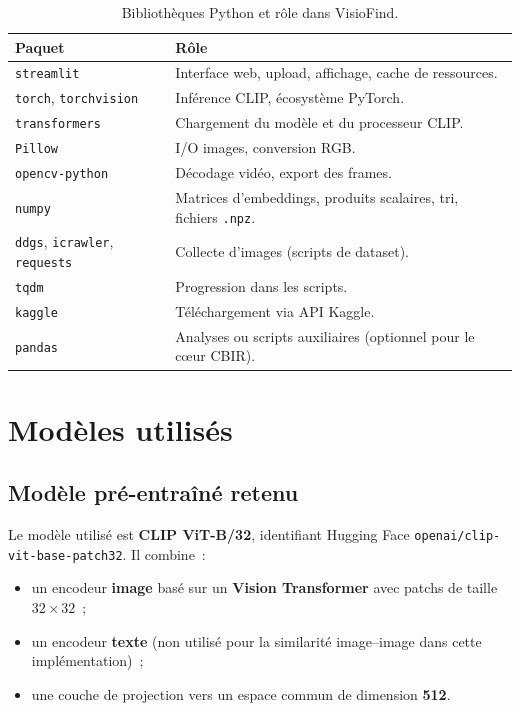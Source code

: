 \documentclass[11pt,a4paper,openany]{report}
\begin{document}
\begin{table}[htbp]
  \centering
  \caption{Bibliothèques Python et rôle dans VisioFind.}
  \label{tab:libs}
  \begin{tabular}{@{}p{3.2cm}p{10.5cm}@{}}
    \toprule
    \textbf{Paquet} & \textbf{Rôle} \\
    \midrule
    \texttt{streamlit} & Interface web, upload, affichage, cache de ressources. \\
    \texttt{torch}, \texttt{torchvision} & Inférence CLIP, écosystème PyTorch. \\
    \texttt{transformers} & Chargement du modèle et du processeur CLIP. \\
    \texttt{Pillow} & I/O images, conversion RGB. \\
    \texttt{opencv-python} & Décodage vidéo, export des frames. \\
    \texttt{numpy} & Matrices d'embeddings, produits scalaires, tri, fichiers \texttt{.npz}. \\
    \texttt{ddgs}, \texttt{icrawler}, \texttt{requests} & Collecte d'images (scripts de dataset). \\
    \texttt{tqdm} & Progression dans les scripts. \\
    \texttt{kaggle} & Téléchargement via API Kaggle. \\
    \texttt{pandas} & Analyses ou scripts auxiliaires (optionnel pour le cœur CBIR). \\
    \bottomrule
  \end{tabular}
\end{table}

\chapter{Modèles utilisés}

\section{Modèle pré-entraîné retenu}

Le modèle utilisé est \textbf{CLIP ViT-B/32}, identifiant Hugging Face \texttt{openai/clip-vit-base-patch32}. Il combine~:
\begin{itemize}[leftmargin=*]
  \item un encodeur \textbf{image} basé sur un \textbf{Vision Transformer} avec patchs de taille $32 \times 32$~;
  \item un encodeur \textbf{texte} (non utilisé pour la similarité image–image dans cette implémentation)~;
  \item une couche de projection vers un espace commun de dimension \textbf{512}.
\end{itemize}
\end{document}
